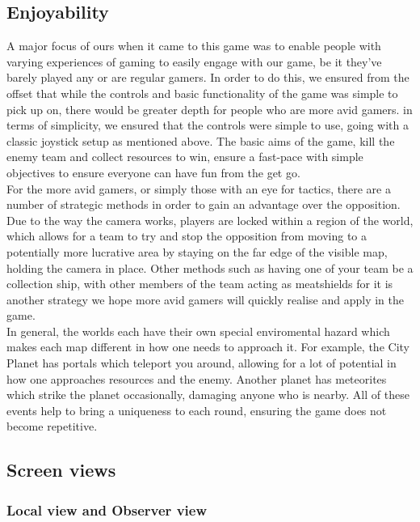 \documentclass[11pt,a4paper]{article}
\begin{document}
      \subsection{Enjoyability}
      A major focus of ours when it came to this game was to enable people with varying experiences of gaming to easily engage with our game, be it they've barely played any or are regular gamers. In order to do this, we ensured from the offset that while the controls and basic functionality of the game was simple to pick up on, there would be greater depth for people who are more avid gamers. in terms of simplicity, we ensured that the controls were simple to use, going with a classic joystick setup as mentioned above. The basic aims of the game, kill the enemy team and collect resources to win, ensure a fast-pace with simple objectives to ensure everyone can have fun from the get go. \\
      For the more avid gamers, or simply those with an eye for tactics, there are a number of strategic methods in order to gain an advantage over the opposition. Due to the way the camera works, players are locked within a region of the world, which allows for a team to try and stop the opposition from moving to a potentially more lucrative area by staying on the far edge of the visible map, holding the camera in place. Other methods such as having one of your team be a collection ship, with other members of the team acting as meatshields for it is another strategy we hope more avid gamers will quickly realise and apply in the game. \\
      In general, the worlds each have their own special enviromental hazard which makes each map different in how one needs to approach it. For example, the City Planet has portals which teleport you around, allowing for a lot of potential in how one approaches resources and the enemy. Another planet has meteorites which strike the planet occasionally, damaging anyone who is nearby. All of these events help to bring a uniqueness to each round, ensuring the game does not become repetitive.


  \subsection{Screen views}


   \subsubsection{Local view and Observer view}
\end{document}
